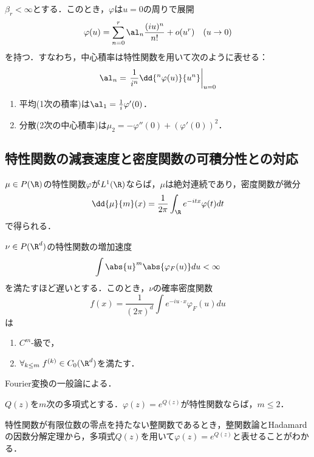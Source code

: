 \documentclass[uplatex,dvipdfmx]{jsreport}
\begin{document}
\begin{corollary}[特性関数のTaylor展開係数からの積率の計算]
    $\beta_r<\infty$とする．このとき，$\varphi$は$u=0$の周りで展開
    \[\varphi(u)=\sum^r_{n=0}\al_n\frac{(iu)^n}{n!}+o(u^r)\quad(u\to0)\]
    を持つ．すなわち，中心積率は特性関数を用いて次のように表せる：
    \[\al_n=\left.\frac{1}{i^n}\dd{^n\varphi(u)}{u^n}\right|_{u=0}\]
\end{corollary}

\begin{corollary}[平均と分散の特性関数による特徴付け]\mbox{}\label{cor-mean-and-variance-in-terms-of-characteristic-function}
    \begin{enumerate}
        \item 平均(1次の積率)は$\al_1=\frac{1}{i}\varphi'(0)$．
        \item 分散(2次の中心積率)は$\mu_2=-\varphi''(0)+(\varphi'(0))^2$．
    \end{enumerate}
\end{corollary}

\subsection{特性関数の減衰速度と密度関数の可積分性との対応}

\begin{corollary}[Levyの反転公式の系]
    $\mu\in P(\R)$の特性関数$\varphi$が$L^1(\R)$ならば，$\mu$は絶対連続であり，密度関数が微分
    \[\dd{\mu}{m}(x)=\frac{1}{2\pi}\int_\R e^{-itx}\varphi(t)dt\]
    で得られる．
\end{corollary}

\begin{proposition}
    $\nu\in P(\R^d)$の特性関数の増加速度
    \[\int\abs{u}^m\abs{\varphi_F(u)}du<\infty\]
    を満たすほど遅いとする．このとき，$\nu$の確率密度関数
    \[f(x)=\frac{1}{(2\pi)^d}\int e^{-iu\cdot x}\varphi_F(u)du\]
    は
    \begin{enumerate}
        \item $C^m$-級で，
        \item $\forall_{k\le m}\;f^{(k)}\in C_0(\R^d)$を満たす．
    \end{enumerate}
\end{proposition}
\begin{Proof}
    Fourier変換の一般論による．
\end{Proof}

\begin{theorem}[Marcinkiewicz]
    $Q(z)$を$m$次の多項式とする．$\varphi(z)=e^{Q(z)}$が特性関数ならば，$m\le 2$．
\end{theorem}
\begin{remarks}
    特性関数が有限位数の零点を持たない整関数であるとき，整関数論とHadamardの因数分解定理から，多項式$Q(z)$を用いて$\varphi(z)=e^{Q(z)}$と表せることがわかる．
\end{remarks}
\end{document}
